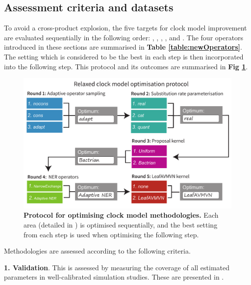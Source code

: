 \documentclass[10pt,letterpaper]{article}
\begin{document}
\subsection*{Assessment criteria and datasets}








To avoid a cross-product explosion, the five targets for clock model improvement are evaluated sequentially in the following order: \textbf{}, \textbf{}, \textbf{}, \textbf{}, and \textbf{}.
The four operators introduced in these sections are summarised in \textbf{Table \ref{table:newOperators}}.
The setting which is considered to be the best in each step is then incorporated into the following step. This protocol and its outcomes are summarised in \textbf{Fig \ref{fig:tournament}}.





\begin{figure}[!h]
\includegraphics[width=\textwidth]{Figures/tournament.pdf}
\caption{\textbf{Protocol for optimising clock model methodologies.} Each area (detailed in \textbf{}) is optimised sequentially, and the best setting from each step is used when optimising the following step.}
\label{fig:tournament}
\end{figure}


Methodologies are assessed according to the following criteria.


\textbf{1. Validation}. This is assessed by measuring the coverage of all estimated parameters in well-calibrated simulation studies. These are presented in \textbf{}. \\
\end{document}
